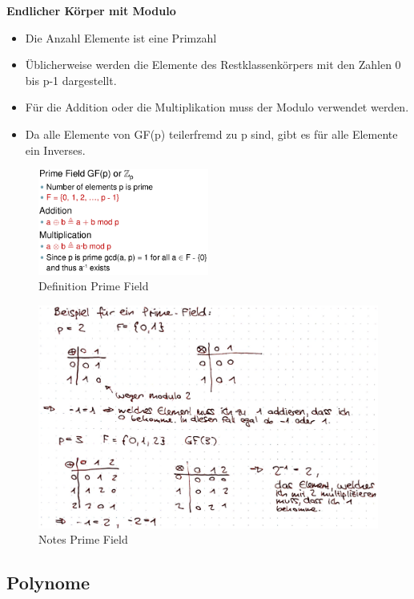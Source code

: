 \textbf{Endlicher Körper mit Modulo} 
\begin{itemize}
    \item Die Anzahl Elemente ist eine Primzahl
    \item Üblicherweise werden die Elemente des Restklassenkörpers mit den Zahlen 0 bis p-1 dargestellt.
    \item Für die Addition oder die Multiplikation muss der Modulo verwendet werden.
    \item Da alle Elemente von GF(p) teilerfremd zu p sind, gibt es für alle Elemente ein Inverses.
\end{itemize}

\begin{figure}[H]
\centering
\includegraphics[width=0.5\textwidth]{figures/primeFields.png}
\caption{Definition Prime Field}
\end{figure}

\begin{figure}[H]
\centering
\includegraphics[width=1\textwidth]{figures/notesPrimeField.png}
\caption{Notes Prime Field}
\end{figure}

\hypertarget{polynome}{%
\subsection{Polynome}\label{polynome}}

